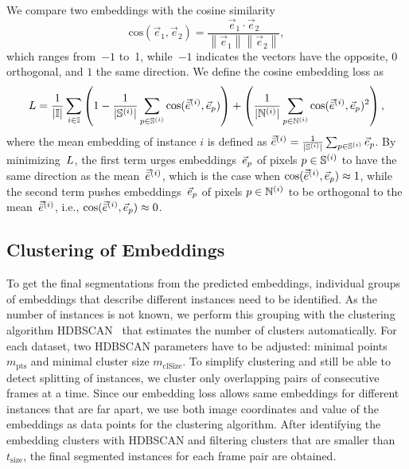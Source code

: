 \documentclass[runningheads,a4paper]{llncs}
\newcommand\norm[1]{\left\lVert#1\right\rVert}
\begin{document}
We compare two embeddings with the cosine similarity
\begin{equation}
\text{cos}(\vec{e}_1,\vec{e}_2)=\frac{\vec{e}_1\cdot\vec{e}_2}{\norm{\vec{e}_1}\norm{\vec{e}_2}},
\end{equation}
which ranges from~$-1$ to~1, while~$-1$ indicates the vectors have the opposite, $0$ orthogonal, and $1$ the same direction.
We define the cosine embedding loss as
\begin{equation}
L=\frac{1}{|\mathbb{I}|}\sum_{i\in\mathbb{I}}\left(1-\frac{1}{|\mathbb{S}^{(i)}|}\sum_{p\in\mathbb{S}^{(i)}}{\text{cos}(\vec{\bar{e}}^{(i)},\vec{e}_p)}\right) + \left(\frac{1}{|\mathbb{N}^{(i)}|}\sum_{p\in\mathbb{N}^{(i)}}{\text{cos}(\vec{\bar{e}}^{(i)},\vec{e}_p)^2}\right),
\end{equation}
where the mean embedding of instance $i$ is defined as
$\vec{\bar{e}}^{(i)}=\frac{1}{|\mathbb{S}^{(i)}|}\sum_{p\in \mathbb{S}^{(i)}}{\vec{e}_p}$.
By minimizing~$L$, the first term urges embeddings~$\vec{e}_p$ of pixels $p\in\mathbb{S}^{(i)}$ to have the same direction as the mean~$\vec{\bar{e}}^{(i)}$, which is the case when $\text{cos}(\vec{\bar{e}}^{(i)},\vec{e}_p)\approx1$, while the second term pushes embeddings~$\vec{e}_p$ of pixels $p\in\mathbb{N}^{(i)}$ to be orthogonal to the mean~$\vec{\bar{e}}^{(i)}$, i.e., $\text{cos}(\vec{\bar{e}}^{(i)},\vec{e}_p)\approx0$.


\subsection{Clustering of Embeddings}
\label{subsec:clustering}

To get the final segmentations from the predicted embeddings, individual groups of embeddings that describe different instances need to be identified.
As the number of instances is not known, we perform this grouping with the clustering algorithm HDBSCAN~\cite{Campello2015} that estimates the number of clusters automatically.
For each dataset, two HDBSCAN parameters have to be adjusted: minimal points $m_{\text{pts}}$ and minimal cluster size $m_{\text{clSize}}$.
To simplify clustering and still be able to detect splitting of instances, we cluster only overlapping pairs of consecutive frames at a time. %
Since our embedding loss allows same embeddings for different instances that are far apart, we use both image coordinates and value of the embeddings as data points for the clustering algorithm.
After identifying the embedding clusters with HDBSCAN and filtering clusters that are smaller than $t_{\text{size}}$, the final segmented instances for each frame pair are obtained.
\end{document}
